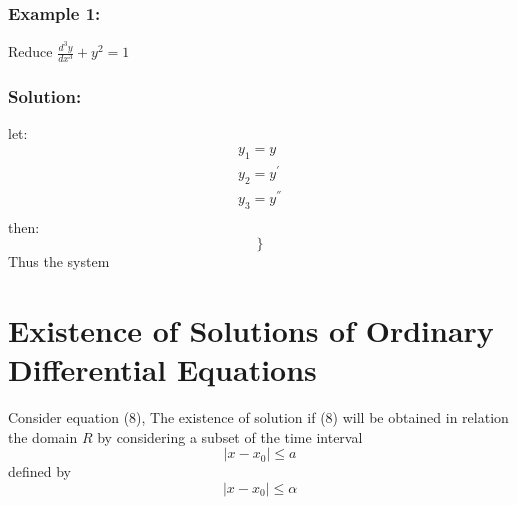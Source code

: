 \documentclass{article}
\begin{document}
\subsubsection*{Example 1:}
Reduce $\frac{d^{3}y}{dx^{3}} + y^{2} = 1$

\subsubsection*{Solution:}
let:
\begin{eqnarray*}
    y_{1} = y \\
    y_{2} = y^{'} \\
    y_{3} = y^{''} \\
\end{eqnarray*}
then:
\[ \left.   \right\}  \]
Thus the system


\section{Existence of Solutions of Ordinary Differential Equations}
Consider equation (8), The existence of solution if (8) will be obtained in relation the domain $R$ by considering a subset of the time interval
\[|x-x_{0}| \leq a\]
defined by \[|x-x_{0}| \leq \alpha\]
\end{document}

